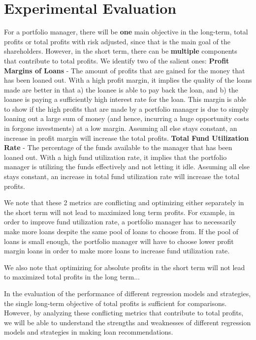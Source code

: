 \documentclass[a4paper]{article}
\theoremstyle{genius}
\begin{document}
\section{Experimental Evaluation}
For a portfolio manager, there will be \textbf{one} main objective in the long-term, total profits or total profits with risk adjusted, since that is the main goal of the shareholders. However, in the short term, there can be \textbf{multiple} components that contribute to total profits. We identify two of the salient ones:
\smallbreak
\textbf{Profit Margins of Loans} - The amount of profits that are gained for the money that has been loaned out. With a high profit margin, it implies the quality of the loans made are better in that a) the loanee is able to pay back the loan, and b) the loanee is paying a sufficiently high interest rate for the loan. This margin is able to show if the high profits that are made by a portfolio manager is due to simply loaning out a large sum of money (and hence, incurring a huge opportunity costs in forgone investments) at a low margin. Assuming all else stays constant, an increase in profit margin will increase the total profits.
\smallbreak
\textbf{Total Fund Utilization Rate} - The percentage of the funds available to the manager that has been loaned out. With a high fund utilization rate, it implies that the portfolio manager is utilizing the funds effectively and not letting it idle. Assuming all else stays constant, an increase in total fund utilization rate will increase the total profits.
\smallbreak

We note that these 2 metrics are conflicting and optimizing either separately in the short term will not lead to maximized long term profits. For example, in order to improve fund utilization rate, a portfolio manager has to necessarily make more loans despite the same pool of loans to choose from. If the pool of loans is small enough, the portfolio manager will have to choose lower profit margin loans in order to make more loans to increase fund utilization rate.

We also note that optimizing for absolute profits in the short term will not lead to maximized total profits in the long term...

In the evaluation of the performance of different regression models and strategies, the single long-term objective of total profits is sufficient for comparisons. However, by analyzing these conflicting metrics that contribute to total profits, we will be able to understand the strengths and weaknesses of different regression models and strategies in making loan recommendations.
\end{document}
